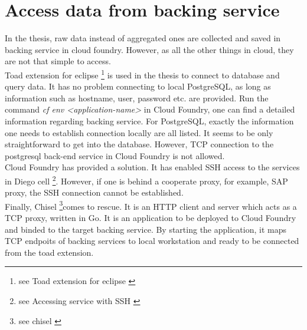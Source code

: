 \section{Access data from backing service}
In the thesis, raw data instead of aggregated ones are collected and saved in backing service in cloud foundry. However, as all the other things in cloud, they are not that simple to access. \\
Toad extension for eclipse \footnote{see Toad extension for eclipse \citep{toad}} is used in the thesis to connect to database and query data. It has no problem connecting to local PostgreSQL, as long as information such as hostname, user, password etc. are provided. Run the command \textit{cf env <application-name>} in Cloud Foundry, one can find a detailed information regarding backing service. For PostgreSQL, exactly the information one needs to establish connection locally are all listed. It seems to be only straightforward to get into the database. However, TCP connection to the postgresql back-end service in Cloud Foundry is not allowed.\\
Cloud Foundry has provided a solution. It has enabled SSH access to the services in Diego cell \footnote{see Accessing service with SSH \citep{SSH}}. However, if one is behind a cooperate proxy, for example, SAP proxy, the SSH connection cannot be established. \\
Finally, Chisel \footnote{see chisel \citep{chisel}}comes to rescue. It is an HTTP client and server which acts as a TCP proxy, written in Go. It is an application to be deployed to Cloud Foundry and binded to the target backing service. By starting the application, it maps TCP endpoits of backing services to local workstation and ready to be connected from the toad extension. 


